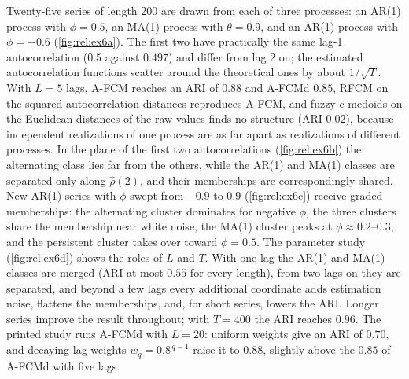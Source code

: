 Twenty-five series of length 200 are drawn from each of three processes: an AR(1) process with $\phi=0.5$, an MA(1) process with $\theta=0.9$, and an AR(1) process with $\phi=-0.6$ (\cref{fig:rel:ex6a}). The first two have practically the same lag-1 autocorrelation ($0.5$ against $0.497$) and differ from lag 2 on; the estimated autocorrelation functions scatter around the theoretical ones by about $1/\sqrt{T}$. With $L=5$ lags, A-FCM reaches an ARI of $0.88$ and A-FCMd $0.85$, RFCM on the squared autocorrelation distances reproduces A-FCM, and fuzzy c-medoids on the Euclidean distances of the raw values finds no structure (ARI $0.02$), because independent realizations of one process are as far apart as realizations of different processes. In the plane of the first two autocorrelations (\cref{fig:rel:ex6b}) the alternating class lies far from the others, while the AR(1) and MA(1) classes are separated only along $\hat\rho(2)$, and their memberships are correspondingly shared. New AR(1) series with $\phi$ swept from $-0.9$ to $0.9$ (\cref{fig:rel:ex6c}) receive graded memberships: the alternating cluster dominates for negative $\phi$, the three clusters share the membership near white noise, the MA(1) cluster peaks at $\phi\approx0.2$--$0.3$, and the persistent cluster takes over toward $\phi=0.5$. The parameter study (\cref{fig:rel:ex6d}) shows the roles of $L$ and $T$. With one lag the AR(1) and MA(1) classes are merged (ARI at most $0.55$ for every length), from two lags on they are separated, and beyond a few lags every additional coordinate adds estimation noise, flattens the memberships, and, for short series, lowers the ARI. Longer series improve the result throughout; with $T=400$ the ARI reaches $0.96$. The printed study runs A-FCMd with $L=20$: uniform weights give an ARI of $0.70$, and decaying lag weights $w_q=0.8^{\,q-1}$ raise it to $0.88$, slightly above the $0.85$ of A-FCMd with five lags.


